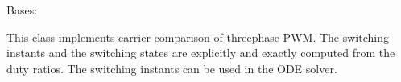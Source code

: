 \documentclass[letterpaper,10pt,english]{sphinxmanual}
\begin{document}
\begin{fulllineitems}
\label{\detokenize{model:model.interfaces.PWM}}
\pysigstartsignatures
{}
\pysigstopsignatures
\sphinxAtStartPar
Bases: 

\sphinxAtStartPar
This class implements carrier comparison of three\sphinxhyphen{}phase PWM. The switching
instants and the switching states are explicitly and exactly computed from
the duty ratios. The switching instants can be used in the ODE solver.

\end{fulllineitems}

\end{document}

